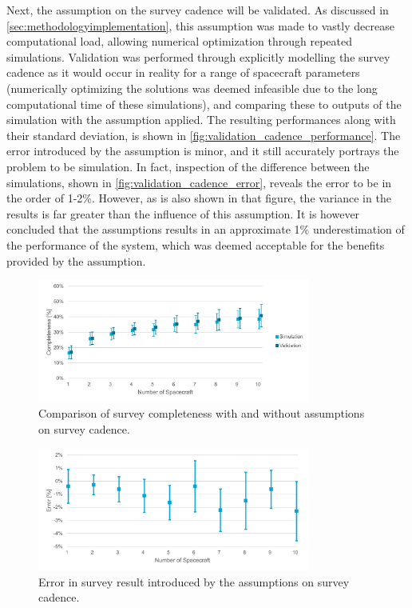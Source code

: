 Next, the assumption on the survey cadence will be validated. As discussed in \autoref{sec:methodologyimplementation}, this assumption was made to vastly decrease computational load, allowing numerical optimization through repeated simulations. Validation was performed through explicitly modelling the survey cadence as it would occur in reality for a range of spacecraft parameters (numerically optimizing the solutions was deemed infeasible due to the long computational time of these simulations), and comparing these to outputs of the simulation with the assumption applied. The resulting performances along with their standard deviation, is shown in \autoref{fig:validation_cadence_performance}. The error introduced by the assumption is minor, and it still accurately portrays the problem to be simulation. In fact, inspection of the difference between the simulations, shown in \autoref{fig:validation_cadence_error}, reveals the error to be in the order of 1-2\%. However, as is also shown in that figure, the variance in the results is far greater than the influence of this assumption. It is however concluded that the assumptions results in an approximate 1\% underestimation of the performance of the system, which was deemed acceptable for the benefits provided by the assumption.

\begin{figure}[htbp]
 \centering
 \includegraphics[width=0.8\textwidth]{img/validation_cadence_performance.pdf}
 \caption{Comparison of survey completeness with and without assumptions on survey cadence.}
 \label{fig:validation_cadence_performance}
\end{figure}

\begin{figure}[htbp]
 \centering
 \includegraphics[width=0.8\textwidth]{img/validation_cadence_error.pdf}
 \caption{Error in survey result introduced by the assumptions on survey cadence.}
 \label{fig:validation_cadence_error}
\end{figure}

